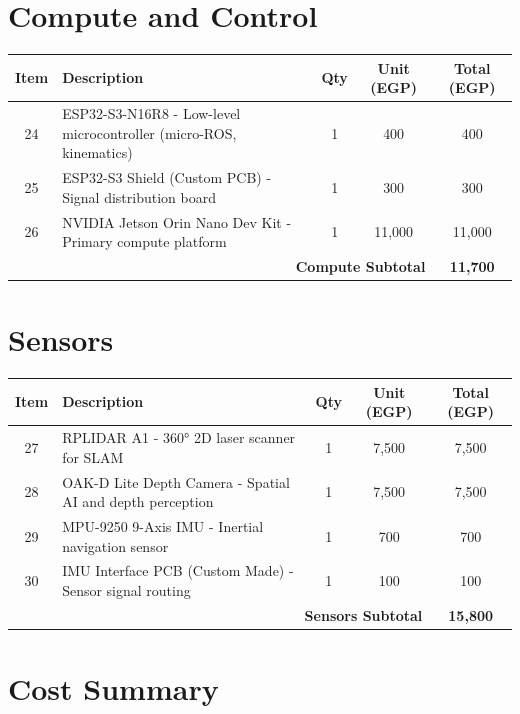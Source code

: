 \section{Compute and Control}

\begin{longtable}{|c|p{4cm}|c|c|c|}
\hline
\textbf{Item} & \textbf{Description} & \textbf{Qty} & \textbf{Unit (EGP)} & \textbf{Total (EGP)} \\
\hline
\endhead
24 & ESP32-S3-N16R8 - Low-level microcontroller (micro-ROS, kinematics) & 1 & 400 & 400 \\
25 & ESP32-S3 Shield (Custom PCB) - Signal distribution board & 1 & 300 & 300 \\
26 & NVIDIA Jetson Orin Nano Dev Kit - Primary compute platform & 1 & 11,000 & 11,000 \\
\hline
\multicolumn{4}{|r|}{\textbf{Compute Subtotal}} & \textbf{11,700} \\
\hline
\end{longtable}

\section{Sensors}

\begin{longtable}{|c|p{4cm}|c|c|c|}
\hline
\textbf{Item} & \textbf{Description} & \textbf{Qty} & \textbf{Unit (EGP)} & \textbf{Total (EGP)} \\
\hline
\endhead
27 & RPLIDAR A1 - 360° 2D laser scanner for SLAM & 1 & 7,500 & 7,500 \\
28 & OAK-D Lite Depth Camera - Spatial AI and depth perception & 1 & 7,500 & 7,500 \\
29 & MPU-9250 9-Axis IMU - Inertial navigation sensor & 1 & 700 & 700 \\
30 & IMU Interface PCB (Custom Made) - Sensor signal routing & 1 & 100 & 100 \\
\hline
\multicolumn{4}{|r|}{\textbf{Sensors Subtotal}} & \textbf{15,800} \\
\hline
\end{longtable}

\section{Cost Summary}

